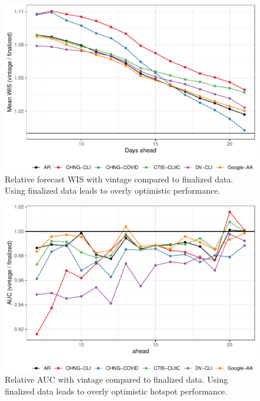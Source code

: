 \clearpage

\begin{figure}

{\centering \includegraphics[width=\textwidth]{fig/fcast-honest-v-finalized-1} 

}

\caption{Relative forecast WIS with vintage compared to finalized data. Using finalized data leads to overly optimistic performance.}\label{fig:fcast-honest-v-finalized}
\end{figure}

\clearpage

\begin{figure}

{\centering \includegraphics[width=\textwidth]{fig/hot-honest-v-finalized-1} 

}

\caption{Relative AUC with vintage compared to finalized data. Using finalized data leads to overly optimistic hotspot performance.}\label{fig:hot-honest-v-finalized}
\end{figure}

